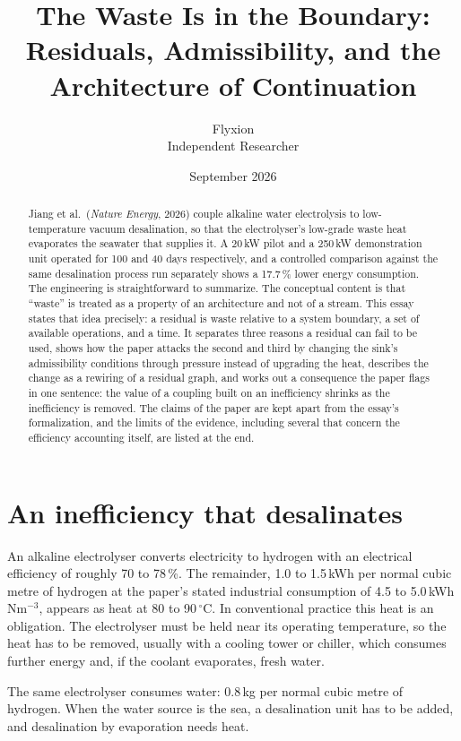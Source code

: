 \documentclass[11pt]{article}
\title{The Waste Is in the Boundary:\\
Residuals, Admissibility, and the Architecture of Continuation}
\author{Flyxion\\\small Independent Researcher}
\date{September 2026}
\theoremstyle{definition}
\theoremstyle{remark}
\begin{document}
\maketitle

\begin{abstract}
\noindent
Jiang et al.\ (\textit{Nature Energy}, 2026) couple alkaline water electrolysis to low-temperature vacuum desalination, so that the electrolyser's low-grade waste heat evaporates the seawater that supplies it. A 20\,kW pilot and a 250\,kW demonstration unit operated for 100 and 40 days respectively, and a controlled comparison against the same desalination process run separately shows a 17.7\,\% lower energy consumption. The engineering is straightforward to summarize. The conceptual content is that ``waste'' is treated as a property of an architecture and not of a stream. This essay states that idea precisely: a residual is waste relative to a system boundary, a set of available operations, and a time. It separates three reasons a residual can fail to be used, shows how the paper attacks the second and third by changing the sink's admissibility conditions through pressure instead of upgrading the heat, describes the change as a rewiring of a residual graph, and works out a consequence the paper flags in one sentence: the value of a coupling built on an inefficiency shrinks as the inefficiency is removed. The claims of the paper are kept apart from the essay's formalization, and the limits of the evidence, including several that concern the efficiency accounting itself, are listed at the end.
\end{abstract}

\section{An inefficiency that desalinates}

An alkaline electrolyser converts electricity to hydrogen with an electrical efficiency of roughly 70 to 78\,\%. The remainder, 1.0 to 1.5\,kWh per normal cubic metre of hydrogen at the paper's stated industrial consumption of 4.5 to 5.0\,kWh\,Nm$^{-3}$, appears as heat at 80 to 90\,$^{\circ}$C. In conventional practice this heat is an obligation. The electrolyser must be held near its operating temperature, so the heat has to be removed, usually with a cooling tower or chiller, which consumes further energy and, if the coolant evaporates, fresh water.

The same electrolyser consumes water: 0.8\,kg per normal cubic metre of hydrogen. When the water source is the sea, a desalination unit has to be added, and desalination by evaporation needs heat.
\end{document}
